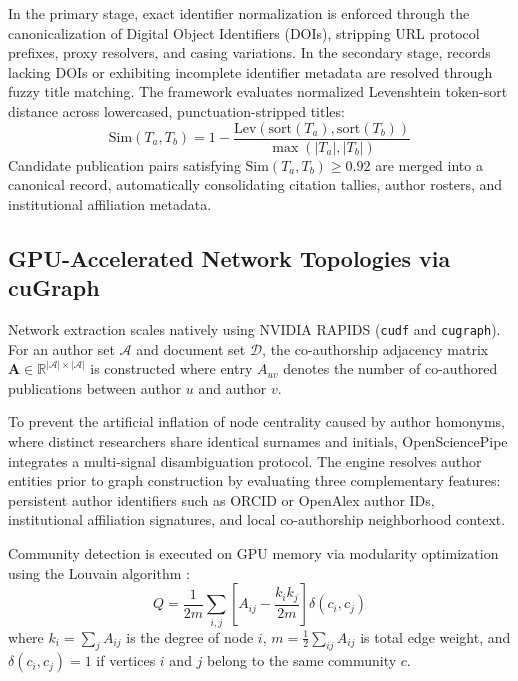 \documentclass[preprint,12pt]{elsarticle}
\begin{document}
In the primary stage, exact identifier normalization is enforced through the canonicalization of Digital Object Identifiers (DOIs), stripping URL protocol prefixes, proxy resolvers, and casing variations. In the secondary stage, records lacking DOIs or exhibiting incomplete identifier metadata are resolved through fuzzy title matching. The framework evaluates normalized Levenshtein token-sort distance across lowercased, punctuation-stripped titles:
\begin{equation}
\text{Sim}(T_a, T_b) = 1 - \frac{\text{Lev}(\text{sort}(T_a), \text{sort}(T_b))}{\max(|T_a|, |T_b|)}
\end{equation}
Candidate publication pairs satisfying $\text{Sim}(T_a, T_b) \ge 0.92$ are merged into a canonical record, automatically consolidating citation tallies, author rosters, and institutional affiliation metadata.

\subsection{GPU-Accelerated Network Topologies via cuGraph}
Network extraction scales natively using NVIDIA RAPIDS (\texttt{cudf} and \texttt{cugraph}). 
For an author set $\mathcal{A}$ and document set $\mathcal{D}$, the co-authorship adjacency matrix $\mathbf{A} \in \mathbb{R}^{|\mathcal{A}| \times |\mathcal{A}|}$ is constructed where entry $A_{uv}$ denotes the number of co-authored publications between author $u$ and author $v$. 

To prevent the artificial inflation of node centrality caused by author homonyms, where distinct researchers share identical surnames and initials, OpenSciencePipe integrates a multi-signal disambiguation protocol. The engine resolves author entities prior to graph construction by evaluating three complementary features: persistent author identifiers such as ORCID or OpenAlex author IDs, institutional affiliation signatures, and local co-authorship neighborhood context. 

Community detection is executed on GPU memory via modularity optimization using the Louvain algorithm \cite{blondel2008fast}:
\begin{equation}
Q = \frac{1}{2m} \sum_{i,j} \left[ A_{ij} - \frac{k_i k_j}{2m} \right] \delta(c_i, c_j)
\end{equation}
where $k_i = \sum_j A_{ij}$ is the degree of node $i$, $m = \frac{1}{2}\sum_{ij} A_{ij}$ is total edge weight, and $\delta(c_i, c_j) = 1$ if vertices $i$ and $j$ belong to the same community $c$.
\end{document}
